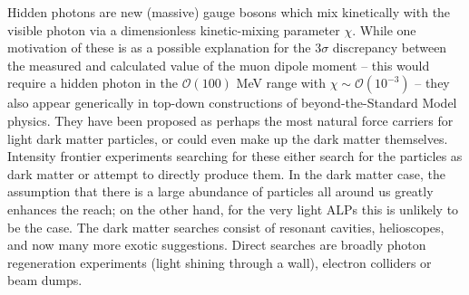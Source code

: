 Hidden photons are new (massive) gauge bosons which mix kinetically with the visible photon via a dimensionless kinetic-mixing parameter $\chi$. While one motivation of these is as a possible explanation for the $3\sigma$ discrepancy between the measured and calculated value of the muon dipole moment -- this would require a hidden photon in the $\mathcal{O}(100)$ MeV range with $\chi \sim \mathcal{O}(10^{-3})$ -- they also appear generically in top-down constructions of beyond-the-Standard Model physics. They have been proposed as perhaps the most natural force carriers for light dark matter particles, or could even make up the dark matter themselves.\\



Intensity frontier experiments searching for these either search for the particles as dark matter or attempt to directly produce them. In the dark matter case, the assumption that there is a large abundance of particles all around us greatly enhances the reach; on the other hand, for the very light ALPs this is unlikely to be the case. The dark matter searches consist of resonant cavities, helioscopes, and now many more exotic suggestions. Direct searches are broadly photon regeneration experiments (light shining through a wall), electron colliders or beam dumps. \\


